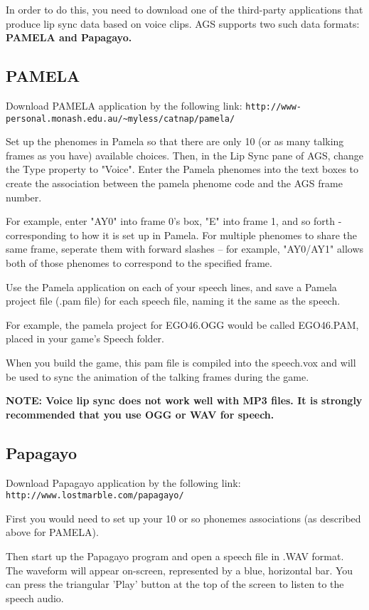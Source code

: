 In order to do this, you need to download one of the third-party applications that produce
lip sync data based on voice clips.
AGS supports two such data formats: \bf{PAMELA} and \bf{Papagayo}.

\subsection{PAMELA}

Download PAMELA application by the following link:
\verb$http://www-personal.monash.edu.au/~myless/catnap/pamela/$

Set up the phenomes in Pamela so that there are only 10 (or as many talking frames as you have)
available choices. Then, in the Lip Sync pane of AGS, change the Type property to "Voice".
Enter the Pamela phenomes into the text boxes to create the association
between the pamela phenome code and the AGS frame number.

For example, enter "AY0" into frame 0's box, "E" into frame 1, and so forth - corresponding
to how it is set up in Pamela. For multiple phenomes to share the same frame, seperate them
with forward slashes -- for example, "AY0/AY1" allows both of those phenomes to correspond
to the specified frame.

Use the Pamela application on each of your speech lines, and save a Pamela project file
(.pam file) for each speech file, naming it the same as the speech.

For example, the pamela project for  EGO46.OGG  would be called  EGO46.PAM, placed
in your game's Speech folder.

When you build the game, this pam file is compiled into the speech.vox and will be used
to sync the animation of the talking frames during the game.

\bf{NOTE:} Voice lip sync does not work well with MP3 files. It is strongly recommended
that you use OGG or WAV for speech.


\subsection{Papagayo}

Download Papagayo application by the following link:
\verb$http://www.lostmarble.com/papagayo/$

First you would need to set up your 10 or so phonemes associations (as described above for PAMELA).

Then start up the Papagayo program and open a speech file in .WAV format. The waveform will appear
on-screen, represented by a blue, horizontal bar. You can press the triangular 'Play' button
at the top of the screen to listen to the speech audio.

